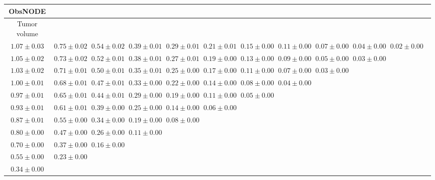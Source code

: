 \begin{table}[ht]
\centering
{\tiny
{
\begin{adjustbox}{width=\textwidth}
\begin{tabular}{cccccccccccc}
\hline
ObsNODE &  &  &  &  &  &  &  &  &  & \\
\hline
Tumor volume &  &  &  &  &  &  &  &  &  & \\
\hline
$1.07 \pm 0.03$ & $0.75 \pm 0.02$ & $0.54 \pm 0.02$ & $0.39 \pm 0.01$ & $0.29 \pm 0.01$ & $0.21 \pm 0.01$ & $0.15 \pm 0.00$ & $0.11 \pm 0.00$ & $0.07 \pm 0.00$ & $0.04 \pm 0.00$ & $0.02 \pm 0.00$ &  \\
$1.05 \pm 0.02$ & $0.73 \pm 0.02$ & $0.52 \pm 0.01$ & $0.38 \pm 0.01$ & $0.27 \pm 0.01$ & $0.19 \pm 0.00$ & $0.13 \pm 0.00$ & $0.09 \pm 0.00$ & $0.05 \pm 0.00$ & $0.03 \pm 0.00$ &  &  \\
$1.03 \pm 0.02$ & $0.71 \pm 0.01$ & $0.50 \pm 0.01$ & $0.35 \pm 0.01$ & $0.25 \pm 0.00$ & $0.17 \pm 0.00$ & $0.11 \pm 0.00$ & $0.07 \pm 0.00$ & $0.03 \pm 0.00$ &  &  &  \\
$1.00 \pm 0.01$ & $0.68 \pm 0.01$ & $0.47 \pm 0.01$ & $0.33 \pm 0.00$ & $0.22 \pm 0.00$ & $0.14 \pm 0.00$ & $0.08 \pm 0.00$ & $0.04 \pm 0.00$ &  &  &  &  \\
$0.97 \pm 0.01$ & $0.65 \pm 0.01$ & $0.44 \pm 0.01$ & $0.29 \pm 0.00$ & $0.19 \pm 0.00$ & $0.11 \pm 0.00$ & $0.05 \pm 0.00$ &  &  &  &  &  \\
$0.93 \pm 0.01$ & $0.61 \pm 0.01$ & $0.39 \pm 0.00$ & $0.25 \pm 0.00$ & $0.14 \pm 0.00$ & $0.06 \pm 0.00$ &  &  &  &  &  &  \\
$0.87 \pm 0.01$ & $0.55 \pm 0.00$ & $0.34 \pm 0.00$ & $0.19 \pm 0.00$ & $0.08 \pm 0.00$ &  &  &  &  &  &  &  \\
$0.80 \pm 0.00$ & $0.47 \pm 0.00$ & $0.26 \pm 0.00$ & $0.11 \pm 0.00$ &  &  &  &  &  &  &  &  \\
$0.70 \pm 0.00$ & $0.37 \pm 0.00$ & $0.16 \pm 0.00$ &  &  &  &  &  &  &  &  &  \\
$0.55 \pm 0.00$ & $0.23 \pm 0.00$ &  &  &  &  &  &  &  &  &  &  \\
$0.34 \pm 0.00$ &  &  &  &  &  &  &  &  &  &  &  \\



\end{tabular}
\end{adjustbox}}}
\end{table}
